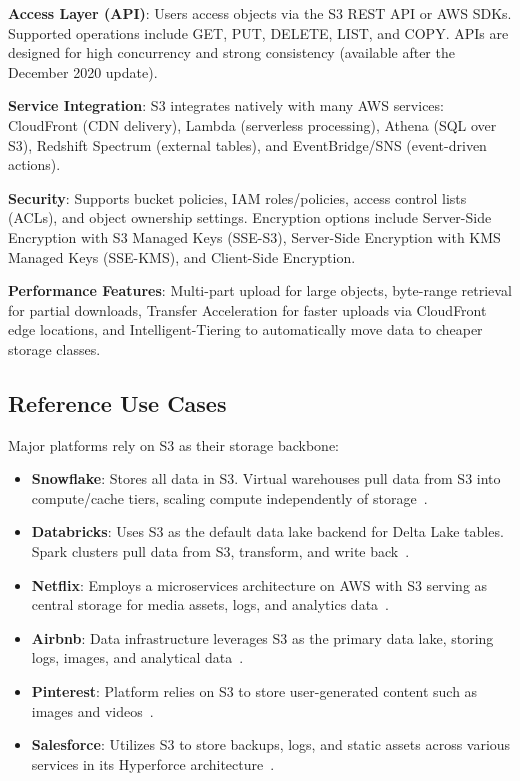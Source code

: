 \textbf{Access Layer (API)}: Users access objects via the S3 REST API or AWS SDKs. Supported operations include GET, PUT, DELETE, LIST, and COPY. APIs are designed for high concurrency and strong consistency (available after the December 2020 update).

\textbf{Service Integration}: S3 integrates natively with many AWS services: CloudFront (CDN delivery), Lambda (serverless processing), Athena (SQL over S3), Redshift Spectrum (external tables), and EventBridge/SNS (event-driven actions).

\textbf{Security}: Supports bucket policies, IAM roles/policies, access control lists (ACLs), and object ownership settings. Encryption options include Server-Side Encryption with S3 Managed Keys (SSE-S3), Server-Side Encryption with KMS Managed Keys (SSE-KMS), and Client-Side Encryption.

\textbf{Performance Features}: Multi-part upload for large objects, byte-range retrieval for partial downloads, Transfer Acceleration for faster uploads via CloudFront edge locations, and Intelligent-Tiering to automatically move data to cheaper storage classes.

\subsection{Reference Use Cases}

Major platforms rely on S3 as their storage backbone:

\begin{itemize}
    \item \textbf{Snowflake}: Stores all data in S3. Virtual warehouses pull data from S3 into compute/cache tiers, scaling compute independently of storage~\cite{dageville2016snowflake}.

    \item \textbf{Databricks}: Uses S3 as the default data lake backend for Delta Lake tables. Spark clusters pull data from S3, transform, and write back~\cite{databricks-multicloud}.

    \item \textbf{Netflix}: Employs a microservices architecture on AWS with S3 serving as central storage for media assets, logs, and analytics data~\cite{aws-netflix-case}.

    \item \textbf{Airbnb}: Data infrastructure leverages S3 as the primary data lake, storing logs, images, and analytical data~\cite{aws-airbnb-case}.

    \item \textbf{Pinterest}: Platform relies on S3 to store user-generated content such as images and videos~\cite{aws-pinterest-case}.

    \item \textbf{Salesforce}: Utilizes S3 to store backups, logs, and static assets across various services in its Hyperforce architecture~\cite{aws-salesforce-case}.
\end{itemize}

